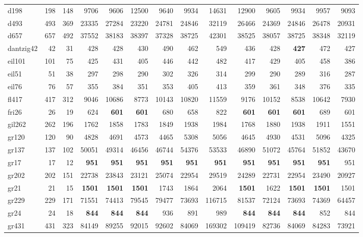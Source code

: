 {\begin{longtable}{l r r r r r r r r r r r r r}
d198 & 198 & 148 & 9706 & 9606 & 12500 & 9640 & 9934 & 14631 & 12900 & 9605 & 9934 & 9957 & 9093 \\
d493 & 493 & 369 & 23335 & 27284 & 23220 & 24781 & 24846 & 32119 & 26466 & 24369 & 24846 & 26478 & 20931 \\
d657 & 657 & 492 & 37552 & 38183 & 38397 & 37328 & 38725 & 42301 & 38525 & 38057 & 38725 & 38348 & 32119 \\
dantzig42 & 42 & 31 & 428 & 428 & 430 & 490 & 462 & 549 & 436 & 428 & \textbf{427} & 472 & 427 \\
eil101 & 101 & 75 & 425 & 431 & 405 & 446 & 442 & 482 & 417 & 429 & 405 & 458 & 386 \\
eil51 & 51 & 38 & 297 & 298 & 290 & 302 & 326 & 314 & 299 & 290 & 289 & 316 & 287 \\
eil76 & 76 & 57 & 355 & 384 & 351 & 353 & 405 & 413 & 359 & 361 & 348 & 376 & 335 \\
fl417 & 417 & 312 & 9046 & 10686 & 8773 & 10143 & 10820 & 11559 & 9176 & 10152 & 8538 & 10642 & 7930 \\
fri26 & 26 & 19 & 624 & \textbf{601} & \textbf{601} & 680 & 658 & 822 & \textbf{601} & \textbf{601} & \textbf{601} & 689 & 601 \\
gil262 & 262 & 196 & 1762 & 1858 & 1783 & 1849 & 1938 & 1984 & 1768 & 1880 & 1938 & 1911 & 1551 \\
gr120 & 120 & 90 & 4828 & 4691 & 4573 & 4465 & 5308 & 5056 & 4645 & 4930 & 4531 & 5096 & 4325 \\
gr137 & 137 & 102 & 50051 & 49314 & 46456 & 46744 & 54376 & 53533 & 46890 & 51072 & 45764 & 51852 & 43670 \\
gr17 & 17 & 12 & \textbf{951} & \textbf{951} & \textbf{951} & \textbf{951} & \textbf{951} & \textbf{951} & \textbf{951} & \textbf{951} & \textbf{951} & \textbf{951} & 951 \\
gr202 & 202 & 151 & 22738 & 23843 & 23121 & 25074 & 22954 & 29519 & 24289 & 22731 & 22954 & 23490 & 20927 \\
gr21 & 21 & 15 & \textbf{1501} & \textbf{1501} & \textbf{1501} & 1743 & 1864 & 2064 & \textbf{1501} & 1622 & \textbf{1501} & \textbf{1501} & 1501 \\
gr229 & 229 & 171 & 71551 & 74413 & 79545 & 79477 & 73693 & 116715 & 81537 & 72124 & 73693 & 74369 & 64457 \\
gr24 & 24 & 18 & \textbf{844} & \textbf{844} & \textbf{844} & 936 & 891 & 989 & \textbf{844} & \textbf{844} & \textbf{844} & 852 & 844 \\
gr431 & 431 & 323 & 84149 & 89255 & 92015 & 92602 & 84069 & 169302 & 109419 & 82736 & 84069 & 84283 & 73921 \\

\end{longtable}}
